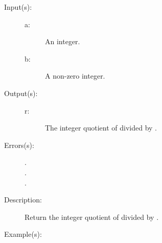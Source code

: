 \begin{description}
\begin{description}
\begin{verbatim}
		\end{verbatim}
	\end{description}
\label{systemdict:idiv}
\item[{\onyxop{a b}{idiv}{r}}: ]
	\begin{description}\item[]
	\item[Input(s): ]
		\begin{description}\item[]
		\item[a: ]
			An integer.
		\item[b: ]
			A non-zero integer.
		\end{description}
	\item[Output(s): ]
		\begin{description}\item[]
		\item[r: ]
			The integer quotient of  divided by .
		\end{description}
	\item[Errors(s): ]
		\begin{description}\item[]
		\item[.]
		\item[.]
		\item[.]
		\end{description}
	\item[Description: ]
		Return the integer quotient of  divided by .
	\item[Example(s): ]\begin{verbatim}


\end{verbatim}
\end{description}
\end{description}
